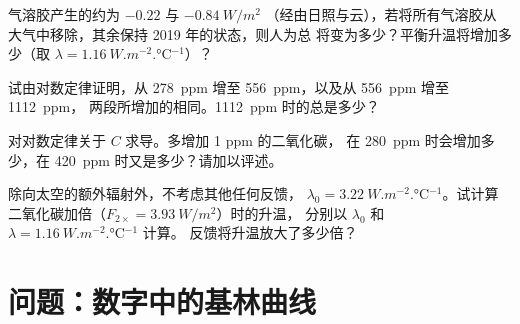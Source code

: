 \begin{exercise}[$\star\star\star$]\label{exo:g12:climate-change:12}
气溶胶产生的约为 $-0.22$ 与 $\qty{-0.84}{W/m^2}$
（经由日照与云），若将所有气溶胶从
大气中移除，其余保持 2019 年的状态，则人为总
将变为多少？平衡升温将增加多少（取
$\lambda = \qty{1.16}{W.m^{-2}.\degreeCelsius^{-1}}$）？
\end{exercise}

\begin{exercise}[$\star\star\star$]\label{exo:g12:climate-change:13}
试由对数定律证明，从 \qty{278}{ppm} 增至
\qty{556}{ppm}，以及从 \qty{556}{ppm} 增至 \qty{1112}{ppm}，
两段所增加的相同。\qty{1112}{ppm} 时的总是多少？
\end{exercise}

\begin{exercise}[$\star\star\star$]\label{exo:g12:climate-change:14}
对对数定律关于 $C$ 求导。多增加 1 ppm 的二氧化碳，
在 \qty{280}{ppm} 时会增加多少，在
\qty{420}{ppm} 时又是多少？请加以评述。
\end{exercise}

\begin{exercise}[$\star\star\star$]\label{exo:g12:climate-change:15}
除向太空的额外辐射外，不考虑其他任何反馈，
$\lambda_0 = \qty{3.22}{W.m^{-2}.\degreeCelsius^{-1}}$。试计算
二氧化碳加倍（$F_{2\times} = \qty{3.93}{W/m^2}$）时的升温，
分别以 $\lambda_0$ 和 $\lambda = \qty{1.16}{W.m^{-2}.\degreeCelsius^{-1}}$ 计算。
反馈将升温放大了多少倍？
\end{exercise}

\section{问题：数字中的基林曲线}

